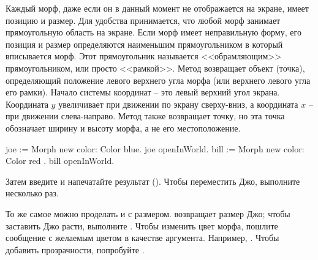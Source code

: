 \documentclass[a4paper,10pt,twoside]{book}
\begin{document}
Каждый морф, даже если он в данный момент не отображается на экране, имеет позицию и размер.
Для удобства принимается, что любой морф занимает прямоугольную область на экране. Если морф имеет неправильную форму, его позиция и размер определяются наименьшим прямоугольником в который вписывается морф. Этот прямоугольник называется <<обрамляющим>> прямоугольником, или просто <<рамкой>>.
Метод  возвращает объект  (точка), определяющий положение левого верхнего угла морфа (или верхнего левого угла его рамки).
Начало системы координат -- это левый верхний угол экрана. Координата $y$ увеличивает при движении по экрану сверху-вниз, а координата $x$ -- при движении слева-направо.
Метод  также возвращает точку, но эта точка обозначает ширину и высоту морфа, а не его местоположение.

\begin{code}{}
joe := Morph new color: Color blue.
joe openInWorld.
bill := Morph new color: Color red .
bill openInWorld.
\end{code}
\noindent
Затем введите  и напечатайте результат ().
Чтобы переместить Джо, выполните  несколько раз.

То же самое можно проделать и с размером.
  возвращает размер Джо; чтобы заставить Джо расти, выполните .
Чтобы изменить цвет морфа, пошлите сообщение  с желаемым цветом в качестве аргумента. Например, .
Чтобы добавить прозрачности, попробуйте .
\end{document}
